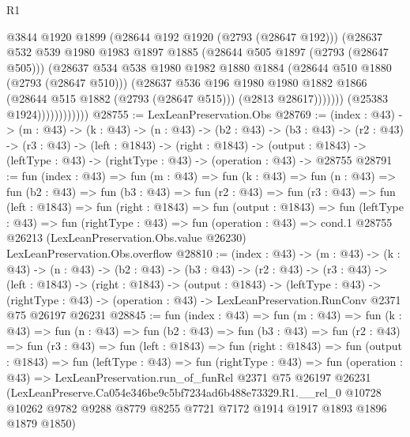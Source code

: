 \begin{lexlean}{R1}
\begin{coremodule}
                                @3844
                                @1920
                                @1899
                                (@28644 @192 @1920 (@2793 (@28647 @192)))
                                (@28637
                                  @532
                                  @539
                                  @1980
                                  @1983
                                  @1897
                                  @1885
                                  (@28644 @505 @1897 (@2793 (@28647 @505)))
                                  (@28637
                                    @534
                                    @538
                                    @1980
                                    @1982
                                    @1880
                                    @1884
                                    (@28644 @510 @1880 (@2793 (@28647 @510)))
                                    (@28637
                                      @536
                                      @196
                                      @1980
                                      @1980
                                      @1882
                                      @1866
                                      (@28644 @515 @1882 (@2793 (@28647 @515)))
                                      (@2813 @28617)))))))
                          (@25383 @1924))))))))))))
@28755 := LexLeanPreservation.Obs
@28769 := (index : @43) ->
  (m : @43) ->
  (k : @43) ->
  (n : @43) ->
  (b2 : @43) ->
  (b3 : @43) ->
  (r2 : @43) ->
  (r3 : @43) ->
  (left : @1843) ->
  (right : @1843) ->
  (output : @1843) -> (leftType : @43) -> (rightType : @43) -> (operation : @43) -> @28755
@28791 := fun (index : @43) =>
  fun (m : @43) =>
  fun (k : @43) =>
  fun (n : @43) =>
  fun (b2 : @43) =>
  fun (b3 : @43) =>
  fun (r2 : @43) =>
  fun (r3 : @43) =>
  fun (left : @1843) =>
  fun (right : @1843) =>
  fun (output : @1843) =>
  fun (leftType : @43) =>
  fun (rightType : @43) =>
  fun (operation : @43) =>
  cond.{1} @28755 @26213 (LexLeanPreservation.Obs.value @26230) LexLeanPreservation.Obs.overflow
@28810 := (index : @43) ->
  (m : @43) ->
  (k : @43) ->
  (n : @43) ->
  (b2 : @43) ->
  (b3 : @43) ->
  (r2 : @43) ->
  (r3 : @43) ->
  (left : @1843) ->
  (right : @1843) ->
  (output : @1843) ->
  (leftType : @43) ->
  (rightType : @43) -> (operation : @43) -> LexLeanPreservation.RunConv @2371 @75 @26197 @26231
@28845 := fun (index : @43) =>
  fun (m : @43) =>
  fun (k : @43) =>
  fun (n : @43) =>
  fun (b2 : @43) =>
  fun (b3 : @43) =>
  fun (r2 : @43) =>
  fun (r3 : @43) =>
  fun (left : @1843) =>
  fun (right : @1843) =>
  fun (output : @1843) =>
  fun (leftType : @43) =>
  fun (rightType : @43) =>
  fun (operation : @43) =>
  LexLeanPreservation.run_of_funRel
    @2371
    @75
    @26197
    @26231
    (LexLeanPreserve.Ca054e346be9c5bf7234ad6b488e73329.R1.__rel_0
      @10728
      @10262
      @9782
      @9288
      @8779
      @8255
      @7721
      @7172
      @1914
      @1917
      @1893
      @1896
      @1879
      @1850)
\end{coremodule}
\end{lexlean}
